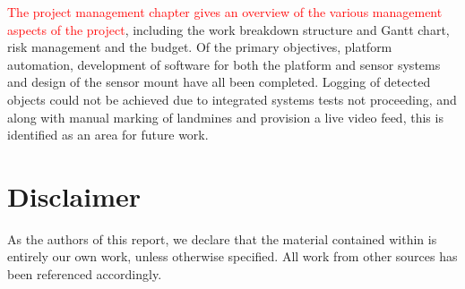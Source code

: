 \documentclass[main.tex]{subfiles}
\begin{document}
\textcolor{red}{The project management chapter gives an overview of the various management aspects of the project}, including the work breakdown structure and Gantt chart, risk management and the budget. 
Of the primary objectives, platform automation, development of software for both the platform and sensor systems and design of the sensor mount have all been completed. Logging of detected objects could not be achieved due to integrated systems tests not proceeding, and along with manual marking of landmines and provision a live video feed, this is identified as an area for future work. 

\newpage
{}
{}	%
\chapter*{Disclaimer}
As the authors of this report, we declare that the material contained within is entirely our own work, unless otherwise specified. All work from other sources has been referenced accordingly. 
\vspace{0.4in}

\end{document}
